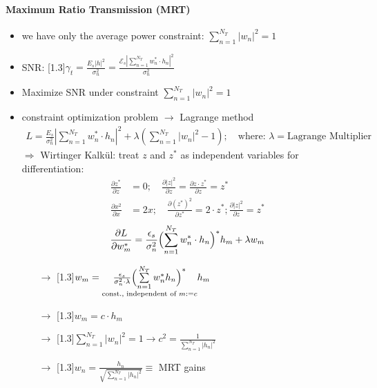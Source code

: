 \documentclass[a4paper, 10pt]{article}
\begin{document}
\paragraph{Maximum Ratio Transmission (MRT)}
\begin{itemize}
	\item we have only the average power constraint: $ \sum\limits_{n = 1}^{N_T} |w_n|^2 = 1 $
	\item SNR:  \scalebox{1.3}[1.3]{$\gamma	 _t = \frac{E_s|h|^2}{\sigma _n^2} = \frac{\mathcal{E}_s\left|\sum\limits_{n = 1}^{N_T}w_n^*\cdot h_n \right|^2}{\sigma _n^2} $} 
	\item Maximize SNR under constraint $ \sum\limits _{n = 1}^{N_T}|w_n|^2 = 1 $
	\item constraint optimization problem $\rightarrow $ Lagrange method
		\begin{align*}
			L = \frac{E_s}{\sigma _n^2}\left| \sum_{n = 1}^{N_T}w_n^*\cdot h_n \right |^2 + \lambda\left ( \sum_{n = 1}^{N_T}|w_n|^2 - 1\right ); \quad \text{where: } \lambda = \text{Lagrange Multiplier}
		\end{align*}
		$\Rightarrow$  Wirtinger Kalk\"ul: treat  $z$  and  $z^*$  as independent variables for differentiation:
		\begin{align*}
			\frac{\partial z^*}{\partial z} &= 0;\quad  \frac{\partial |z|^2}{\partial z} = \frac{\partial z\cdot z^*}{\partial z} = z^*\\
			\frac{\partial x^2}{\partial x} &= 2x; \quad \frac{\partial (z^*)^2}{\partial z^*} = 2\cdot z^*;  \frac{\partial |z|^2}{\partial z} = z^*
		\end{align*}
		\begin{align*}
			\frac{\partial L}{\partial w_m^*} = \frac{\epsilon _s}{\sigma _n^2}\Bigl ( \sum_{n = 1}^{N_T}w_n^*\cdot h_n\Bigr )^*h_m + \lambda w_m
		\end{align*}
		\begin{itemize}
			\item[$\rightarrow$] \scalebox{1.3}[1.3]{$   w_m =\underset{\text{const., independent of } m:=c}{\frac{\epsilon _s}{\sigma _n^2 \cdot \lambda}\Bigl ( \sum\limits_{n = 1}^{N_T}w_n^*h_n \Bigr )^*}h_m $}
			\item[$\rightarrow$] \scalebox{1.3}[1.3]{$  w_m = c\cdot h_m$}
			\item[$\rightarrow$] \scalebox{1.3}[1.3]{$ \sum\limits_{n = 1}^{N_T} |w_n|^2 = 1 \rightarrow c^2 = \frac{1}{\sum\limits_{n = 1}^{N_T}|h_n|^2}  $}
			\item[$\rightarrow$] \scalebox{1.3}[1.3]{$  w_n = \frac{h_n}{\sqrt{\sum\limits_{n = 1}^{N_T}|h_n|^2}} \equiv $} MRT gains 

\end{itemize}
\end{itemize}
\end{document}
